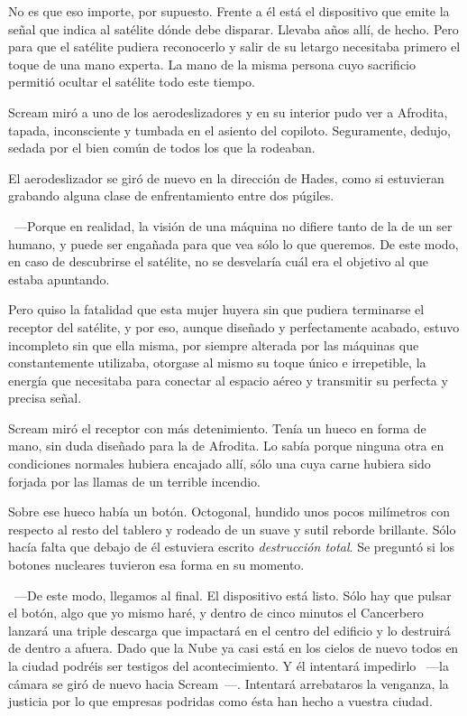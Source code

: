 \rquoti No es que eso importe, por supuesto. Frente a él está el dispositivo que emite la señal que indica al satélite dónde debe disparar. Llevaba años allí, de hecho. Pero para que el satélite pudiera reconocerlo y salir de su letargo necesitaba primero el toque de una mano experta. La mano de la misma persona cuyo sacrificio permitió ocultar el satélite todo este tiempo.

Scream miró a uno de los aerodeslizadores y en su interior pudo ver a Afrodita, tapada, inconsciente y tumbada en el asiento del copiloto. Seguramente, dedujo, sedada por el bien común de todos los que la rodeaban.

El aerodeslizador se giró de nuevo en la dirección de Hades, como si estuvieran grabando alguna clase de enfrentamiento entre dos púgiles.

~---Porque en realidad, la visión de una máquina no difiere tanto de la de un ser humano, y puede ser engañada para que vea sólo lo que queremos. De este modo, en caso de descubrirse el satélite, no se desvelaría cuál era el objetivo al que estaba apuntando.

\rquoti Pero quiso la fatalidad que esta mujer huyera sin que pudiera terminarse el receptor del satélite, y por eso, aunque diseñado y perfectamente acabado, estuvo incompleto sin que ella misma, por siempre alterada por las máquinas que constantemente utilizaba, otorgase al mismo su toque único e irrepetible, la energía que necesitaba para conectar al espacio aéreo y transmitir su perfecta y precisa señal.

Scream miró el receptor con más detenimiento. Tenía un hueco en forma de mano, sin duda diseñado para la de Afrodita. Lo sabía porque ninguna otra en condiciones normales hubiera encajado allí, sólo una cuya carne hubiera sido forjada por las llamas de un terrible incendio.

Sobre ese hueco había un botón. Octogonal, hundido unos pocos milímetros con respecto al resto del tablero y rodeado de un suave y sutil reborde brillante. Sólo hacía falta que debajo de él estuviera escrito \emph{destrucción total}. Se preguntó si los botones nucleares tuvieron esa forma en su momento.

~---De este modo, llegamos al final. El dispositivo está listo. Sólo hay que pulsar el botón, algo que yo mismo haré, y dentro de cinco minutos el Cancerbero lanzará una triple descarga que impactará en el centro del edificio y lo destruirá de dentro a afuera. Dado que la Nube ya casi está en los cielos de nuevo todos en la ciudad podréis ser testigos del acontecimiento. Y él intentará impedirlo ~---la cámara se giró de nuevo hacia Scream~---. Intentará arrebataros la venganza, la justicia por lo que empresas podridas como ésta han hecho a vuestra ciudad.

